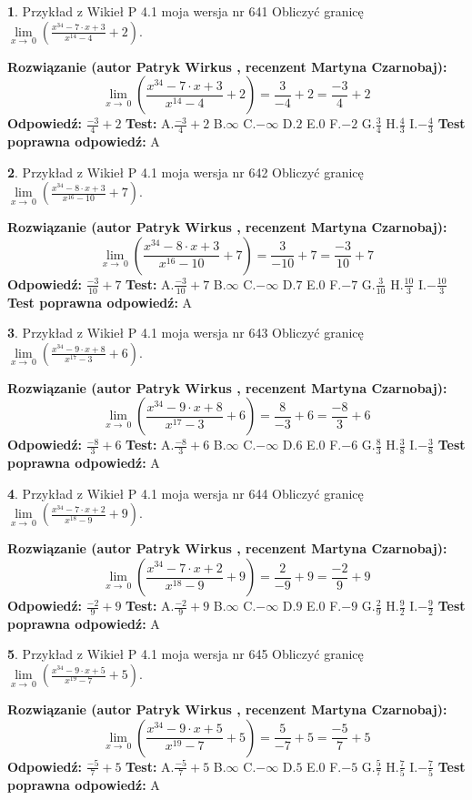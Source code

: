 \documentclass[12pt, a4paper]{article}
\theoremstyle{definition} %
\newtheorem{zad}{}
\newcommand{\zadStart}[1]{\begin{zad}#1\newline}
\newcommand{\zadStop}{\end{zad}}
\newcommand{\rozwStart}[2]{\noindent \textbf{Rozwiązanie (autor #1 , recenzent #2): }\newline}
\newcommand{\rozwStop}{\newline}
\newcommand{\odpStart}{\noindent \textbf{Odpowiedź:}\newline}
\newcommand{\odpStop}{\newline}
\newcommand{\testStart}{\noindent \textbf{Test:}\newline}
\newcommand{\testStop}{\newline}
\newcommand{\kluczStart}{\noindent \textbf{Test poprawna odpowiedź:}\newline}
\newcommand{\kluczStop}{\newline}
\begin{document}
\zadStart{Przykład z Wikieł P 4.1 moja wersja nr 641}
Obliczyć granicę $\lim\limits_{x\to\ 0}(\frac{x^{34}-7 \cdot x +3}{x^{14}-4}+2)$.
\zadStop
\rozwStart{Patryk Wirkus}{Martyna Czarnobaj}
$$\lim\limits_{x\to\ 0}(\frac{x^{34}-7 \cdot x +3}{x^{14}-4}+2)=\frac{3}{-4}+2=\frac{-3}{4}+2$$
\rozwStop
\odpStart
$\frac{-3}{4}+2$
\odpStop
\testStart
A.$\frac{-3}{4}+2$
B.$\infty$
C.$-\infty$
D.$2$
E.$0$
F.$-2$
G.$\frac{3}{4}$
H.$\frac{4}{3}$
I.$-\frac{4}{3}$
\testStop
\kluczStart
A
\kluczStop



\zadStart{Przykład z Wikieł P 4.1 moja wersja nr 642}
Obliczyć granicę $\lim\limits_{x\to\ 0}(\frac{x^{34}-8 \cdot x +3}{x^{16}-10}+7)$.
\zadStop
\rozwStart{Patryk Wirkus}{Martyna Czarnobaj}
$$\lim\limits_{x\to\ 0}(\frac{x^{34}-8 \cdot x +3}{x^{16}-10}+7)=\frac{3}{-10}+7=\frac{-3}{10}+7$$
\rozwStop
\odpStart
$\frac{-3}{10}+7$
\odpStop
\testStart
A.$\frac{-3}{10}+7$
B.$\infty$
C.$-\infty$
D.$7$
E.$0$
F.$-7$
G.$\frac{3}{10}$
H.$\frac{10}{3}$
I.$-\frac{10}{3}$
\testStop
\kluczStart
A
\kluczStop



\zadStart{Przykład z Wikieł P 4.1 moja wersja nr 643}
Obliczyć granicę $\lim\limits_{x\to\ 0}(\frac{x^{34}-9 \cdot x +8}{x^{17}-3}+6)$.
\zadStop
\rozwStart{Patryk Wirkus}{Martyna Czarnobaj}
$$\lim\limits_{x\to\ 0}(\frac{x^{34}-9 \cdot x +8}{x^{17}-3}+6)=\frac{8}{-3}+6=\frac{-8}{3}+6$$
\rozwStop
\odpStart
$\frac{-8}{3}+6$
\odpStop
\testStart
A.$\frac{-8}{3}+6$
B.$\infty$
C.$-\infty$
D.$6$
E.$0$
F.$-6$
G.$\frac{8}{3}$
H.$\frac{3}{8}$
I.$-\frac{3}{8}$
\testStop
\kluczStart
A
\kluczStop



\zadStart{Przykład z Wikieł P 4.1 moja wersja nr 644}
Obliczyć granicę $\lim\limits_{x\to\ 0}(\frac{x^{34}-7 \cdot x +2}{x^{18}-9}+9)$.
\zadStop
\rozwStart{Patryk Wirkus}{Martyna Czarnobaj}
$$\lim\limits_{x\to\ 0}(\frac{x^{34}-7 \cdot x +2}{x^{18}-9}+9)=\frac{2}{-9}+9=\frac{-2}{9}+9$$
\rozwStop
\odpStart
$\frac{-2}{9}+9$
\odpStop
\testStart
A.$\frac{-2}{9}+9$
B.$\infty$
C.$-\infty$
D.$9$
E.$0$
F.$-9$
G.$\frac{2}{9}$
H.$\frac{9}{2}$
I.$-\frac{9}{2}$
\testStop
\kluczStart
A
\kluczStop



\zadStart{Przykład z Wikieł P 4.1 moja wersja nr 645}
Obliczyć granicę $\lim\limits_{x\to\ 0}(\frac{x^{34}-9 \cdot x +5}{x^{19}-7}+5)$.
\zadStop
\rozwStart{Patryk Wirkus}{Martyna Czarnobaj}
$$\lim\limits_{x\to\ 0}(\frac{x^{34}-9 \cdot x +5}{x^{19}-7}+5)=\frac{5}{-7}+5=\frac{-5}{7}+5$$
\rozwStop
\odpStart
$\frac{-5}{7}+5$
\odpStop
\testStart
A.$\frac{-5}{7}+5$
B.$\infty$
C.$-\infty$
D.$5$
E.$0$
F.$-5$
G.$\frac{5}{7}$
H.$\frac{7}{5}$
I.$-\frac{7}{5}$
\testStop
\kluczStart
A
\kluczStop
\end{document}
